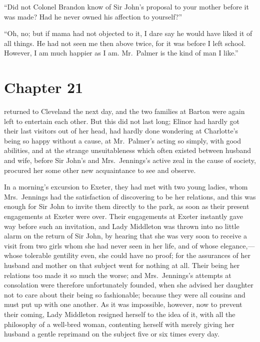 ``Did not Colonel Brandon know of Sir John's proposal
to your mother before it was made?  Had he never owned
his affection to yourself?''

``Oh, no; but if mama had not objected to it,
I dare say he would have liked it of all things.
He had not seen me then above twice, for it was before
I left school.  However, I am much happier as I am.
Mr.\ Palmer is the kind of man I like.''



\chapter{Chapter 21}


 returned to Cleveland the next day,
and the two families at Barton were again left to entertain
each other.  But this did not last long; Elinor had hardly
got their last visitors out of her head, had hardly done
wondering at Charlotte's being so happy without a cause,
at Mr.\ Palmer's acting so simply, with good abilities,
and at the strange unsuitableness which often existed between
husband and wife, before Sir John's and Mrs.\ Jennings's
active zeal in the cause of society, procured her some
other new acquaintance to see and observe.

In a morning's excursion to Exeter, they had met with
two young ladies, whom Mrs.\ Jennings had the satisfaction
of discovering to be her relations, and this was enough
for Sir John to invite them directly to the park,
as soon as their present engagements at Exeter were over.
Their engagements at Exeter instantly gave way before
such an invitation, and Lady Middleton was thrown into
no little alarm on the return of Sir John, by hearing
that she was very soon to receive a visit from two girls
whom she had never seen in her life, and of whose elegance,---%
whose tolerable gentility even, she could have no proof;
for the assurances of her husband and mother on that subject
went for nothing at all.  Their being her relations too
made it so much the worse; and Mrs.\ Jennings's attempts
at consolation were therefore unfortunately founded,
when she advised her daughter not to care about their being
so fashionable; because they were all cousins and must put
up with one another.  As it was impossible, however, now to
prevent their coming, Lady Middleton resigned herself to the
idea of it, with all the philosophy of a well-bred woman,
contenting herself with merely giving her husband a gentle
reprimand on the subject five or six times every day.

